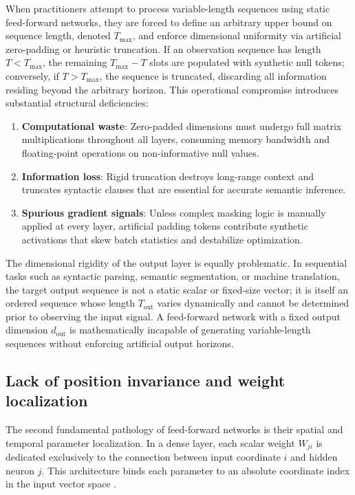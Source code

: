 \documentclass[../../main.tex]{subfiles}
\begin{document}
When practitioners attempt to process variable-length sequences using static feed-forward networks, they are forced to define an arbitrary upper bound on sequence length, denoted $T_{\max}$, and enforce dimensional uniformity via artificial zero-padding or heuristic truncation. If an observation sequence has length $T < T_{\max}$, the remaining $T_{\max} - T$ slots are populated with synthetic null tokens; conversely, if $T > T_{\max}$, the sequence is truncated, discarding all information residing beyond the arbitrary horizon. This operational compromise introduces substantial structural deficiencies:
\begin{enumerate}
    \item \textbf{Computational waste}: Zero-padded dimensions must undergo full matrix multiplications throughout all layers, consuming memory bandwidth and floating-point operations on non-informative null values.
    \item \textbf{Information loss}: Rigid truncation destroys long-range context and truncates syntactic clauses that are essential for accurate semantic inference.
    \item \textbf{Spurious gradient signals}: Unless complex masking logic is manually applied at every layer, artificial padding tokens contribute synthetic activations that skew batch statistics and destabilize optimization.
\end{enumerate}

The dimensional rigidity of the output layer is equally problematic. In sequential tasks such as syntactic parsing, semantic segmentation, or machine translation, the target output sequence is not a static scalar or fixed-size vector; it is itself an ordered sequence whose length $T_{\text{out}}$ varies dynamically and cannot be determined prior to observing the input signal. A feed-forward network with a fixed output dimension $d_{\text{out}}$ is mathematically incapable of generating variable-length sequences without enforcing artificial output horizons.

\subsection{Lack of position invariance and weight localization}
\label{subsec:rnn_weight_localization}

The second fundamental pathology of feed-forward networks is their spatial and temporal parameter localization. In a dense layer, each scalar weight $W_{ji}$ is dedicated exclusively to the connection between input coordinate $i$ and hidden neuron $j$. This architecture binds each parameter to an absolute coordinate index in the input vector space \citep{bishop2024deep}.
\end{document}
